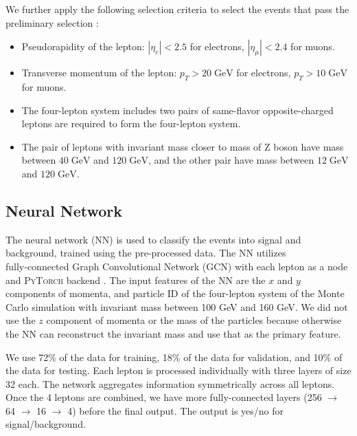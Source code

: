 We further apply the following selection criteria to select the events that pass the preliminary selection \cite{CMS:2012qbp}:
\begin{itemize}
  \item Pseudorapidity of the lepton: $|\eta_e| < 2.5$ for electrons, $|\eta_\mu| < 2.4$ for muons.
  \item Transverse momentum of the lepton: $p_T > 20\;\text{GeV}$ for electrons, $p_T > 10\;\text{GeV}$ for muons.
  \item The four-lepton system includes two pairs of same-flavor opposite-charged leptons are required to form the four-lepton system. 
  \item The pair of leptons with invariant mass closer to mass of Z boson have mass between $40\;\text{GeV}$ and $120\;\text{GeV}$, and the other pair have mass between $12\;\text{GeV}$ and $120\;\text{GeV}$.
\end{itemize}

\subsection{Neural Network}
The neural network (NN) is used to classify the events into signal and background, trained using the pre-processed data. The NN utilizes fully‑connected Graph Convolutional Network (GCN) \cite{kipf2017semi} with each lepton as a node and \textsc{PyTorch} backend \cite{paszke2019pytorch}. The input features of the NN are the $x$ and $y$ components of momenta, and particle ID of the four-lepton system of the Monte Carlo simulation with invariant mass between 100 GeV and 160 GeV. We did not use the $z$ component of momenta or the mass of the particles because otherwise the NN can reconstruct the invariant mass and use that as the primary feature. 

We use 72\% of the data for training, 18\% of the data for validation, and 10\% of the data for testing. Each lepton is processed individually with three layers of size 32 each. The network aggregates information symmetrically across all leptons. Once the 4 leptons are combined, we have more fully-connected layers (256 $\to$ 64 $\to$ 16 $\to$ 4) before the final output. The output is yes/no for signal/background. 

